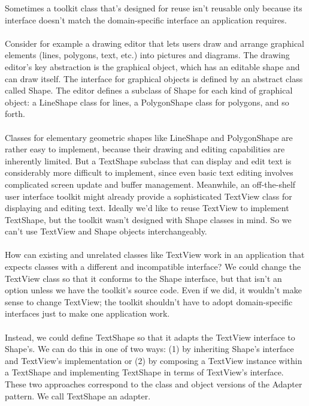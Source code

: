 Sometimes a toolkit class that's designed for reuse isn't reusable only because its interface doesn't match the domain-specific interface an application requires.
\\\\
Consider for example a drawing editor that lets users draw and arrange graphical elements (lines, polygons, text, etc.) into pictures and diagrams. The drawing editor's key abstraction is the graphical object, which has an editable shape and can draw itself. The interface for graphical objects is defined by an abstract class called Shape. The editor defines a subclass of Shape for each kind of graphical object: a LineShape class for lines, a PolygonShape class for polygons, and so forth.
\\\\
Classes for elementary geometric shapes like LineShape and PolygonShape are rather easy to implement, because their drawing and editing capabilities are inherently limited. But a TextShape subclass that can display and edit text is considerably more difficult to implement, since even basic text editing involves complicated screen update and buffer management. Meanwhile, an off-the-shelf user interface toolkit might already provide a sophisticated TextView class for displaying and editing text. Ideally we'd like to reuse TextView to implement TextShape, but the toolkit wasn't designed with Shape classes in mind. So we can't use TextView and Shape objects interchangeably.
\\\\
How can existing and unrelated classes like TextView work in an application that expects classes with a different and incompatible interface? We could change the TextView class so that it conforms to the Shape interface, but that isn't an option unless we have the toolkit's source code. Even if we did, it wouldn't make sense to change TextView; the toolkit shouldn't have to adopt domain-specific interfaces just to make one application work.
\\\\
Instead, we could define TextShape so that it adapts the TextView interface to Shape's. We can do this in one of two ways: (1) by inheriting Shape's interface and TextView's implementation or (2) by composing a TextView instance within a TextShape and implementing TextShape in terms of TextView's interface. These two approaches correspond to the class and object versions of the Adapter pattern. We call TextShape an adapter.
\\\\
